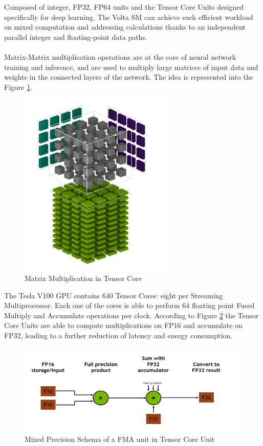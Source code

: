 Composed of integer, FP32, FP64 units and the Tensor Core Units designed specifically for deep learning. The Volta SM can achieve such efficient workload on mixed computation and addressing calculations thanks to an independent parallel integer and floating-point data paths. \\\\

Matrix-Matrix multiplication operations are at the core of neural network training and inference, and are used to multiply large matrices of input data and weights in the connected layers of the network. The idea is represented into the Figure \ref{fig:tensorcorevolta}.

\begin{figure}[!htbp]
\centering
\captionsetup{justification=centering}
\includegraphics[scale=0.7]{./figure/tensor_core.PNG}
\caption{Matrix Multiplication in Tensor Core\cite{paper:41}}
\label{fig:tensorcorevolta}
\end{figure}

The Tesla V100 GPU contains 640 Tensor Cores: eight per Streaming Multiprocessor. Each one of the cores is able to perform 64 floating point Fused Multiply and Accumulate operations per clock.
According to Figure \ref{fig:mixprec} the Tensor Core Units are able to compute multiplications on FP16 and accumulate on FP32, leading to a further reduction of latency and energy consumption.
\begin{figure}[!htbp]
\centering
\captionsetup{justification=centering}
\includegraphics[scale=0.8]{./figure/mix_prec.PNG}
\caption{Mixed Precision Schema of a FMA unit in Tensor Core Unit\cite{paper:41}}
\label{fig:mixprec}
\end{figure}

